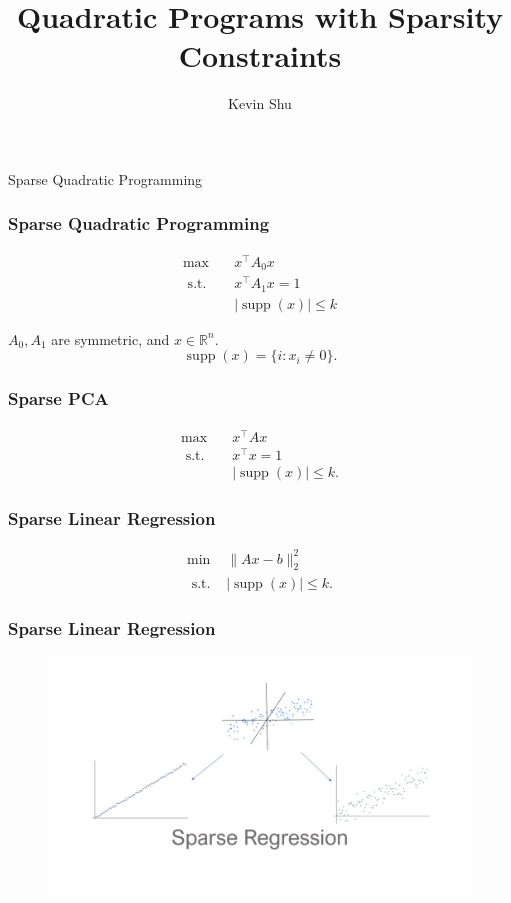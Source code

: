 \documentclass{beamer}
\title{Quadratic Programs with Sparsity Constraints}
\author{Kevin Shu\inst{1}}
\institute{\inst{1} Georgia Institute of Technology}
\date{}
\newcommand{\R}{\mathbb{R}}
\DeclareMathOperator*{\supp}{supp}
\newcommand{\st}{{\text{ s.t. }}}
\begin{document}
\frame{\titlepage}
\begin{frame}
    \centering
    \huge
    {\color{gray}Sparse Quadratic Programming}
\end{frame}
\begin{frame}
\frametitle{Sparse Quadratic Programming}
    \begin{equation*}
        \begin{aligned}
            \max\quad & x^{\intercal}A_0x\\
            \st & x^{\intercal}A_1x = 1\\
                &|\supp(x)| \le k
        \end{aligned}
    \end{equation*}
    \vspace{0.125in}

    $A_0, A_1$ are symmetric, and $x \in \R^n$. 
    \[
        \supp(x) = \{i : x_i \neq 0\}.
    \]

\end{frame}
\begin{frame}
    \frametitle{Sparse PCA}
    \begin{equation*}
        \begin{aligned}
            \max\quad & x^{\intercal}Ax\\
            \st & x^{\intercal}x = 1\\
                &|\supp(x)| \le k.
        \end{aligned}
    \end{equation*}
\end{frame}
\begin{frame}
    \frametitle{Sparse Linear Regression}
    \begin{equation*}
        \begin{aligned}
        \min & \|Ax - b\|_2^2\\
        \st & |\supp(x)| \le k.
        \end{aligned}
    \end{equation*}
\end{frame}
\begin{frame}
    \frametitle{Sparse Linear Regression}
    \begin{figure}[h]
        \centering
        \includegraphics[width=\linewidth]{slide3.jpg}
    \end{figure}
\end{frame}
\end{document}

